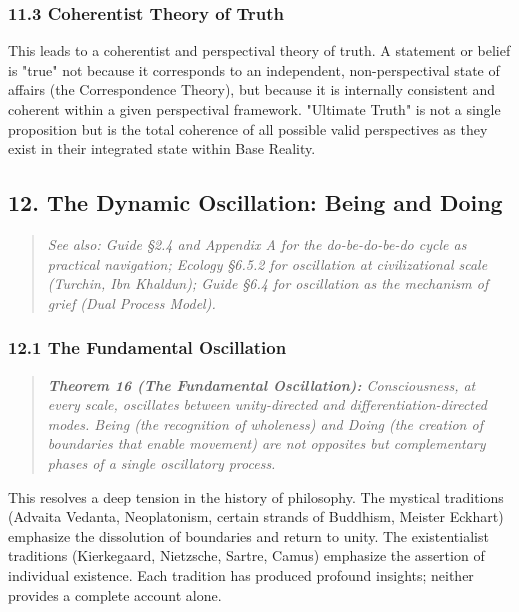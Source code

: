 \subsubsection*{11.3 Coherentist Theory of Truth}


This leads to a coherentist and perspectival theory of truth. A statement or belief is "true" not because it corresponds to an independent, non-perspectival state of affairs (the Correspondence Theory), but because it is internally consistent and coherent within a given perspectival framework. "Ultimate Truth" is not a single proposition but is the total coherence of all possible valid perspectives as they exist in their integrated state within Base Reality.


\bigskip\noindent\makebox[\textwidth]{\color{rulegray}\rule{5cm}{0.3pt}}\bigskip


\subsection*{12. The Dynamic Oscillation: Being and Doing}


\begin{quote}
\itshape
\textit{See also: Guide §2.4 and Appendix A for the do-be-do-be-do cycle as practical navigation; Ecology §6.5.2 for oscillation at civilizational scale (Turchin, Ibn Khaldun); Guide §6.4 for oscillation as the mechanism of grief (Dual Process Model).}
\end{quote}


\subsubsection*{12.1 The Fundamental Oscillation}


\begin{quote}
\itshape
\textbf{Theorem 16 (The Fundamental Oscillation):} \textit{Consciousness, at every scale, oscillates between unity-directed and differentiation-directed modes. Being (the recognition of wholeness) and Doing (the creation of boundaries that enable movement) are not opposites but complementary phases of a single oscillatory process.}
\end{quote}


This resolves a deep tension in the history of philosophy. The mystical traditions (Advaita Vedanta, Neoplatonism, certain strands of Buddhism, Meister Eckhart) emphasize the dissolution of boundaries and return to unity. The existentialist traditions (Kierkegaard, Nietzsche, Sartre, Camus) emphasize the assertion of individual existence. Each tradition has produced profound insights; neither provides a complete account alone.


